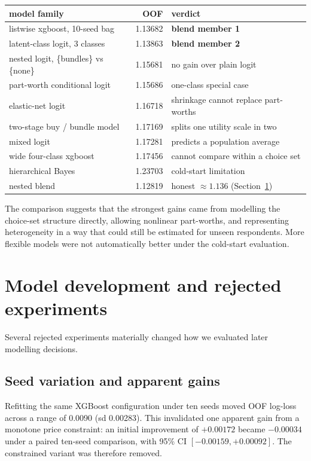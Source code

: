 \documentclass[11pt]{article}
\begin{document}
\begin{center}\small
\begin{tabular}{lrl}
\toprule
model family & OOF & verdict \\
\midrule
listwise xgboost, 10-seed bag & 1.13682 & \textbf{blend member 1} \\
latent-class logit, 3 classes & 1.13863 & \textbf{blend member 2} \\
nested logit, \{bundles\} vs \{none\} & 1.15681 & no gain over plain logit \\
part-worth conditional logit & 1.15686 & one-class special case \\
elastic-net logit & 1.16718 & shrinkage cannot replace part-worths \\
two-stage buy / bundle model & 1.17169 & splits one utility scale in two \\
mixed logit & 1.17281 & predicts a population average \\
wide four-class xgboost & 1.17456 & cannot compare within a choice set \\
hierarchical Bayes & 1.23703 & cold-start limitation \\
\midrule
nested blend & 1.12819 & honest $\approx 1.136$ (Section~\ref{sec:fail}) \\
\bottomrule
\end{tabular}
\end{center}

\noindent The comparison suggests that the strongest gains came from modelling the
choice-set structure directly, allowing nonlinear part-worths, and representing
heterogeneity in a way that could still be estimated for unseen respondents. More
flexible models were not automatically better under the cold-start evaluation.

\section{Model development and rejected experiments}\label{sec:fail}

Several rejected experiments materially changed how we evaluated later modelling
decisions.

\subsection{Seed variation and apparent gains}

Refitting the same XGBoost configuration under ten seeds moved OOF log-loss across a
range of 0.0090 (sd 0.00283). This invalidated one apparent gain from a monotone price
constraint: an initial improvement of $+0.00172$ became $-0.00034$ under a paired
ten-seed comparison, with 95\% CI $[-0.00159,+0.00092]$. The constrained variant was
therefore removed.
\end{document}
